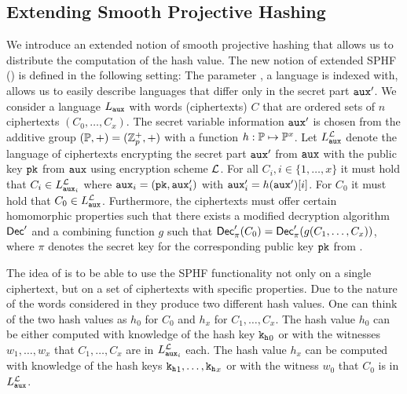 \subsection{Extending Smooth Projective Hashing}\label{sec:sphff}
We introduce an extended notion of smooth projective hashing that allows us to distribute the computation of the hash value.
The new notion of extended SPHF (\SPHFF) is defined in the following setting:
The parameter \aux, a language is indexed with, allows us to easily describe languages that differ only in the secret part $\mathtt{aux}'$.
We consider a language $L_\mathtt{aux}$ with words (ciphertexts) $C$ that are ordered sets of $n$ ciphertexts $(C_0,\dots,C_x)$.
The secret variable information $\mathtt{aux}'$ is chosen from the additive group $(\mathbb{P},+)=(\mathbb{Z}_p^{+},+)$ with a function $h:\mathbb{P}\mapsto\mathbb{P}^x$.
Let $L^\mathcal{L}_\mathtt{aux}$ denote the language of ciphertexts encrypting the secret part $\mathtt{aux}'$ from $\mathtt{aux}$ with the public key $\mathtt{pk}$ from $\mathtt{aux}$ using encryption scheme $\mathcal{L}$.
For all $C_i, i\in\{1,\dots,x\}$ it must hold that $C_i\in L^\mathcal{L}_{\mathtt{aux}_i}$ where $\mathtt{aux}_i=(\mathtt{pk},\mathtt{aux}'_i)$ with $\mathtt{aux}'_i=h(\mathtt{aux}')[i]$.
For $C_0$ it must hold that $C_0\in L^\mathcal{L}_{\mathtt{aux}}$.
Furthermore, the ciphertexts must offer certain homomorphic properties such that there exists a modified decryption algorithm $\mathsf{Dec}'$ and a combining function $g$ such that $\mathsf{Dec}'_{\pi}(C_0)=\mathsf{Dec}'_{\pi}(g(C_1,\dots,C_x))$, where $\pi$ denotes the secret key for the corresponding public key $\mathtt{pk}$ from \crs.

The idea of \SPHFF is to be able to use the SPHF functionality not only on a single ciphertext, but on a set of ciphertexts with specific properties.
Due to the nature of the words considered in \SPHFF they produce two different hash values.
One can think of the two hash values as $h_0$ for $C_0$ and  $h_x$ for $C_1,\dots,C_x$.
The hash value $h_0$ can be either computed with knowledge of the hash key $\mathtt{k_h}_0$ or with the witnesses $w_1,\dots,w_x$ that $C_1,\dots,C_x$ are in $L^\mathcal{L}_{\mathtt{aux}_i}$ each.
The hash value $h_x$ can be computed with knowledge of the hash keys $\mathtt{k_h}_1,\dots,\mathtt{k_h}_x$ or with the witness $w_0$ that $C_0$ is in $L^\mathcal{L}_{\mathtt{aux}}$.

